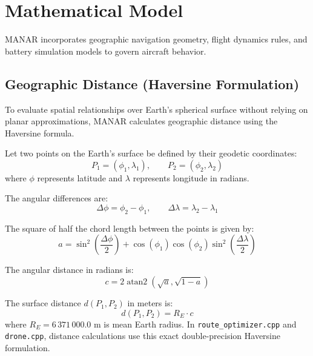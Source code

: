\section{Mathematical Model}

MANAR incorporates geographic navigation geometry, flight dynamics rules, and battery simulation models to govern aircraft behavior.

\subsection{Geographic Distance (Haversine Formulation)}
To evaluate spatial relationships over Earth's spherical surface without relying on planar approximations, MANAR calculates geographic distance using the Haversine formula.

Let two points on the Earth's surface be defined by their geodetic coordinates:
\begin{equation}
P_1 = (\phi_1, \lambda_1), \qquad P_2 = (\phi_2, \lambda_2)
\end{equation}
where $\phi$ represents latitude and $\lambda$ represents longitude in radians.

The angular differences are:
\begin{equation}
\Delta\phi = \phi_2 - \phi_1, \qquad \Delta\lambda = \lambda_2 - \lambda_1
\end{equation}

The square of half the chord length between the points is given by:
\begin{equation}
a = \sin^2\left(\frac{\Delta\phi}{2}\right) + \cos(\phi_1)\cos(\phi_2)\sin^2\left(\frac{\Delta\lambda}{2}\right)
\end{equation}

The angular distance in radians is:
\begin{equation}
c = 2 \operatorname{atan2}\left(\sqrt{a}, \sqrt{1 - a}\right)
\end{equation}

The surface distance $d(P_1, P_2)$ in meters is:
\begin{equation}
d(P_1, P_2) = R_E \cdot c
\end{equation}
where $R_E = 6\,371\,000.0\text{ m}$ is mean Earth radius. In \texttt{route\_optimizer.cpp} and \texttt{drone.cpp}, distance calculations use this exact double-precision Haversine formulation.

